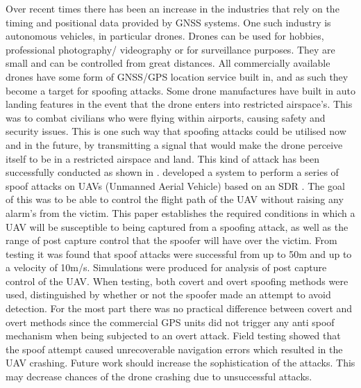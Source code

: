 Over recent times there has been an increase in the industries that rely on the timing and positional data provided by GNSS systems. One such industry is autonomous
vehicles, in particular drones. Drones can be used for hobbies, professional photography/ videography or for surveillance purposes. They are small and can be controlled from great
distances. All commercially available drones have some form of GNSS/GPS location service built in, and as such they become a target for spoofing attacks. Some drone
manufactures have built in auto landing features in the event that the drone enters into restricted airspace's. This was to combat civilians who were flying within
airports, causing safety and security issues. This is one such way that spoofing attacks could be utilised now and in the future, by transmitting a signal that would make
the drone perceive itself to be in a restricted airspace and land. This kind of attack has been successfully conducted as shown in \cite{RN4}. 
\textcite{RN21} developed a system to perform a series of spoof attacks on UAVs (Unmanned Aerial Vehicle) based on an SDR \cite{RN23}. The goal of this was to be able to 
control the flight path of the UAV without raising any alarm's from the victim. This paper establishes the required conditions in which a UAV will
be susceptible to being captured from a spoofing attack, as well as the range of post capture control that the spoofer will have over the victim.
From testing it was found that spoof attacks were successful from up to 50m and up to a velocity of 10m/s.
Simulations were produced for analysis of post capture control of the UAV. 
When testing, both covert and overt spoofing methods were used, distinguished by whether or not the spoofer made an attempt to avoid detection. For the most part there
was no practical difference between covert and overt methods since the commercial GPS units did not trigger any anti spoof mechanism when being subjected to an overt
attack. Field testing showed that the spoof attempt caused unrecoverable navigation errors which resulted in the UAV crashing. Future work should increase the
sophistication of the attacks. This may decrease chances of the drone crashing due to unsuccessful attacks.

